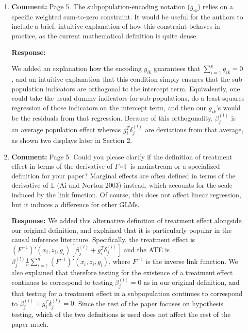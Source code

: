 \documentclass[11pt, a4paper]{article}
\newcommand{\reply}{\vspace{0.3cm} \noindent \textbf{Response:} {\it }}
\begin{document}
\begin{enumerate}[leftmargin=*]

\item \textbf{Comment:} Page 5. The subpopulation-encoding notation ($g_{ik}$) relies on a specific weighted sum-to-zero constraint. It would be useful for the authors to include a brief, intuitive explanation of how this constraint behaves in practice, as the current mathematical definition is quite dense.

\reply

We added an explanation how the encoding $g_{ik}$ guarantees that $\sum_{i=1}^n g_{ik}=0$, and an intuitive explanation that this condition simply ensures that the sub-population indicators are orthogonal to the intercept term. Equivalently, one could take the usual dummy indicators for sub-populations, do a least-squares regression of those indicators on the intercept term, and then our $g_{ik}$'s would be the residuals from that regression.
Because of this orthogonality, $\beta_j^{(l)}$ is an average population effect whereas $g_i^T \delta_j^{(l)}$ are deviations from that average, as shown two displays later in Section 2.

\vspace{0.5cm}


\item \textbf{Comment:} Page 5. Could you please clarify if the definition of treatment effect in terms of the derivative of $F\circ\mathbb{F}$ is mainstream or a specialized definition for your paper? Marginal effects are often defined in terms of the derivative of $\mathbb{E}$ (Ai and Norton 2003) instead, which accounts for the scale induced by the link function. Of course, this does not affect linear regression, but it induces a difference for other GLMs.

\reply We added this alternative definition of treatment effect alongside our original definition, and explained that it is particularly popular in the causal inference literature. Specifically, the treatment effect is $(F^{-1})' (x_i, z_i, g_i) [ \beta_j^{(l)} + g_i^T \delta_j^{(l)} ]$ and the ATE is $\beta_j^{(l)} \frac{1}{n} \sum_{i=1}^n (F^{-1})' (x_i, z_i, g_i)$, where $F^{-1}$ is the inverse link function.
We also explained that therefore testing for the existence of a treatment effect continues to correspond to testing $\beta_j^{(l)}=0$ as in our original definition, and that testing for a treatment effect in a subpopulation continues to correspond to $\beta_j^{(l)} + g_i^T \delta_j^{(l)} =0$.
Since the rest of the paper focuses on hypothesis testing, which of the two definitions is used does not affect the rest of the paper much.



\end{enumerate}
\end{document}
